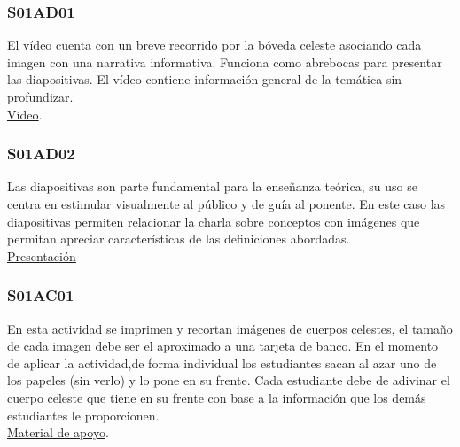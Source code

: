 \documentclass[10pt,a4paper]{article}
\begin{document}
\subsubsection{S01AD01}
El vídeo cuenta con un breve recorrido por la bóveda celeste asociando cada imagen con una narrativa informativa.  Funciona como abrebocas para presentar las diapositivas. El vídeo contiene información general de la temática sin profundizar. \\

\href{https://www.youtube.com/watch?v=uDNVux4hifg}{\underline{Vídeo}}.

\subsubsection{S01AD02}
Las diapositivas son parte fundamental para la enseñanza teórica, su uso se centra en estimular visualmente al público y de guía al ponente. En este caso las diapositivas permiten relacionar la charla sobre conceptos con imágenes que permitan apreciar características de las definiciones abordadas. \\

\href{https://github.com/miguelta281/Universo_Medible_II/blob/master/Presentaciones/Sesiones/Sesion_1/sesion_1.pdf}{\underline{Presentación}} 
\subsubsection{S01AC01}
En esta actividad se imprimen y recortan imágenes de cuerpos celestes, el tamaño de cada imagen debe ser el aproximado a una tarjeta de banco. En el momento de aplicar la actividad,de forma individual los estudiantes sacan al azar uno de los papeles (sin verlo) y lo pone en su frente. Cada estudiante debe de adivinar el cuerpo celeste que tiene en su frente con base a la información que los demás estudiantes le proporcionen. \\

\href{https://drive.google.com/open?id=1RAebM96U-GMtoShplpoVWEjKgREIFwrt}{\underline{Material de apoyo}}.
\end{document}
